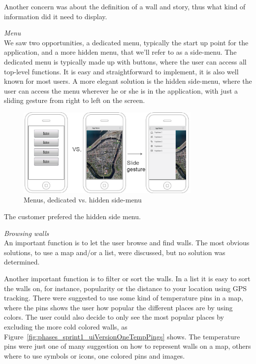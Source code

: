 \documentclass[11pt]{book}
\begin{document}
Another concern was about the definition of a wall and story, thus what kind of information did it need to display.

\textit{Menu}\\
We saw two opportunities, a dedicated menu, typically the start up point for the application, and a more hidden menu, that we'll refer to as a side-menu. The dedicated menu is typically made up with buttons, where the user can access all top-level functions. It is easy and straightforward to implement, it is also well known for most users. A more elegant solution is the hidden side-menu, where the user can access the menu wherever he or she is in the application, with just a sliding gesture from right to left on the screen.

\begin{figure}[H]
    \centering
    \includegraphics[width=0.8\textwidth]{Figures/Phases/Sprint1/versiononeSliding.png}
    \caption{Menus, dedicated vs. hidden side-menu}
    \label{fig:phases_sprint1_uiVersionOneMenu}
\end{figure}

The customer prefered the hidden side menu.

\textit{Browsing walls}\\
An important function is to let the user browse and find walls. The most obvious solutions, to use a map and/or a list, were discussed, but no solution was determined. 

Another important function is to filter or sort the walls. In a list it is easy to sort the walls on, for instance, popularity or the distance to your location using GPS tracking. There were suggested to use some kind of temperature pins in a map, where the pins shows the user how popular the different places are by using colors. The user could also decide to only see the most popular places by excluding the more cold colored walls, as Figure~\ref{fig:phases_sprint1_uiVersionOneTempPings} shows. The temperature pins were just one of many suggestion on how to represent walls on a map, others where to use symbols or icons, one colored pins and images.
\end{document}
